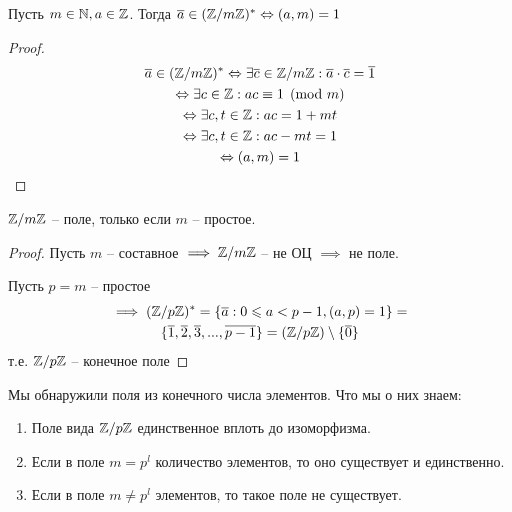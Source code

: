 \documentclass[main]{subfiles}
\begin{document}
\begin{theorem}
    Пусть $m \in \mathbb{N}, a \in \mathbb{Z}$. Тогда $\overline{a} \in (\mathbb{Z}/m\mathbb{Z})^* \Leftrightarrow (a,m)=1$
\end{theorem}
\begin{proof}
    \begin{gather*}
        \overline{a} \in (\mathbb{Z}/m\mathbb{Z})^* \Leftrightarrow
        \exists \overline{c} \in \mathbb{Z}/m\mathbb{Z}: \overline{a}\cdot\overline{c} = \overline{1}\\
        \Leftrightarrow \exists c \in \mathbb{Z}: ac \equiv 1 \pmod{m}\\
        \Leftrightarrow \exists c,t \in \mathbb{Z}: ac = 1+mt\\
        \Leftrightarrow \exists c,t \in \mathbb{Z}: ac-mt = 1\\
        \Leftrightarrow (a,m) = 1
    \end{gather*}
\end{proof}

\begin{corollary}
    $\mathbb{Z}/m\mathbb{Z}$ -- поле, только если $m$ -- простое.
\end{corollary}
\begin{proof}
    Пусть $m$ -- составное $\implies \mathbb{Z}/m\mathbb{Z}$ -- не ОЦ $\implies$ не поле.

    Пусть $p=m$ -- простое
    \begin{gather*}
        \implies (\mathbb{Z}/p\mathbb{Z})^* = \{\overline{a}: 0 \leqslant a < p-1, (a,p) = 1\}=\\
        \{\overline{1},\overline{2},\overline{3},...,\overline{p-1}\} = (\mathbb{Z}/p\mathbb{Z})\setminus \{\overline{0}\}
    \end{gather*}
    т.е. $\mathbb{Z}/p\mathbb{Z}$ -- конечное поле
\end{proof}

Мы обнаружили поля из конечного числа элементов. Что мы о них знаем:
\begin{enumerate}
    \item Поле вида $\mathbb{Z}/p\mathbb{Z}$ единственное вплоть до изоморфизма.
    \item Если в поле $m=p^l$ количество элементов, то оно существует и единственно.
    \item Если в поле $m\neq p^l$ элементов, то такое поле не существует.
\end{enumerate}
\end{document}
